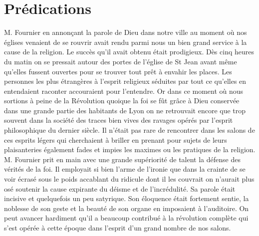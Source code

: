 \section*{Prédications}
M. Fournier en annonçant la parole de Dieu dans notre ville au moment où nos églises venaient de se rouvrir avait rendu parmi nous un bien grand service à la cause de la religion. Le succès qu'il avait obtenu était prodigieux. Dès cinq heures du matin on se pressait autour des portes de l'église de St Jean avant même qu'elles fussent ouvertes pour se trouver
tout prêt à envahir les places. Les personnes les plus étrangères à l'esprit religieux séduites par tout ce qu'elles en entendaient raconter accouraient pour l'entendre. Or dans ce moment où nous sortions à peine de la Révolution quoique la foi se fût grâce à Dieu conservée dans une grande partie des habitants de Lyon on ne retrouvait encore que trop souvent dans la société des traces bien vives des ravages opérés par l'esprit philosophique du dernier siècle. Il n'était pas rare de rencontrer dans les salons de ces esprits légers qui cherchaient à briller en prenant pour sujets de leurs plaisanteries également fades et impies les maximes ou les pratiques de la religion. M. Fournier prit en main avec une grande supériorité de talent la défense des vérités de la foi. Il employait si bien l'arme de l'ironie que dans la crainte de se voir écrasé sous le poids accablant du ridicule dont il les couvrait on n'aurait plus osé soutenir la cause expirante du déisme et de l'incrédulité. Sa parole était incisive et quelquefois un peu satyrique. Son éloquence était fortement sentie, la noblesse de son geste et la beauté de son organe en imposaient à l'auditoire. On peut avancer hardiment qu'il a beaucoup contribué à la révolution complète qui s'est opérée à cette époque dans l'esprit d'un grand nombre de nos salons.

